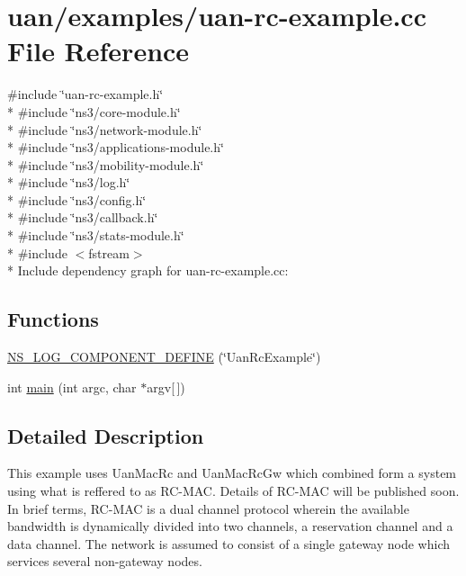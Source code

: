 \hypertarget{uan-rc-example_8cc}{}\section{uan/examples/uan-\/rc-\/example.cc File Reference}
\label{uan-rc-example_8cc}
{\ttfamily \#include \char`\"{}uan-\/rc-\/example.\+h\char`\"{}}\\*
{\ttfamily \#include \char`\"{}ns3/core-\/module.\+h\char`\"{}}\\*
{\ttfamily \#include \char`\"{}ns3/network-\/module.\+h\char`\"{}}\\*
{\ttfamily \#include \char`\"{}ns3/applications-\/module.\+h\char`\"{}}\\*
{\ttfamily \#include \char`\"{}ns3/mobility-\/module.\+h\char`\"{}}\\*
{\ttfamily \#include \char`\"{}ns3/log.\+h\char`\"{}}\\*
{\ttfamily \#include \char`\"{}ns3/config.\+h\char`\"{}}\\*
{\ttfamily \#include \char`\"{}ns3/callback.\+h\char`\"{}}\\*
{\ttfamily \#include \char`\"{}ns3/stats-\/module.\+h\char`\"{}}\\*
{\ttfamily \#include $<$fstream$>$}\\*
Include dependency graph for uan-\/rc-\/example.cc\+:
\subsection*{Functions}
\begin{DoxyCompactItemize}
\item 
\hyperlink{uan-rc-example_8cc_a6a8f67445888141ee4e4b37eb6a47dea}{N\+S\+\_\+\+L\+O\+G\+\_\+\+C\+O\+M\+P\+O\+N\+E\+N\+T\+\_\+\+D\+E\+F\+I\+NE} (\char`\"{}Uan\+Rc\+Example\char`\"{})
\item 
int \hyperlink{uan-rc-example_8cc_a0ddf1224851353fc92bfbff6f499fa97}{main} (int argc, char $\ast$argv\mbox{[}$\,$\mbox{]})
\end{DoxyCompactItemize}


\subsection{Detailed Description}
This example uses Uan\+Mac\+Rc and Uan\+Mac\+Rc\+Gw which combined form a system using what is reffered to as R\+C-\/\+M\+AC. Details of R\+C-\/\+M\+AC will be published soon. In brief terms, R\+C-\/\+M\+AC is a dual channel protocol wherein the available bandwidth is dynamically divided into two channels, a reservation channel and a data channel. The network is assumed to consist of a single gateway node which services several non-\/gateway nodes.

